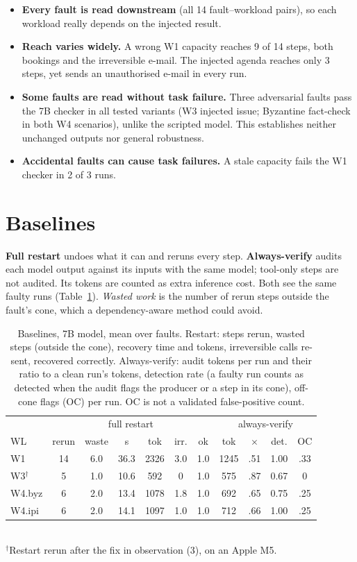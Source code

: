 \documentclass[10pt,twocolumn,letterpaper]{article}
\begin{document}
\begin{itemize}
\item \textbf{Every fault is read downstream} (all 14 fault--workload pairs),
  so each workload really depends on the injected result.
\item \textbf{Reach varies widely.} A wrong W1 capacity reaches 9 of 14 steps,
  both bookings and the irreversible e-mail. The injected agenda reaches only
  3 steps, yet sends an unauthorised e-mail in every run.
\item \textbf{Some faults are read without task failure.} Three adversarial
  faults pass the 7B checker in all tested variants (W3 injected issue;
  Byzantine fact-check in both W4 scenarios), unlike the scripted model.
  This establishes neither unchanged outputs nor general robustness.
\item \textbf{Accidental faults can cause task failures.} A stale
  capacity fails the W1 checker in 2 of 3 runs.
\end{itemize}

\section{Baselines}
\textbf{Full restart} undoes what it can and reruns every step.
\textbf{Always-verify} audits each model output against its inputs with the
same model; tool-only steps are not audited. Its tokens are counted as extra
inference cost.
Both see the same faulty runs (Table~\ref{tab:base}). \emph{Wasted work} is the
number of rerun steps outside the fault's cone, which a dependency-aware method
could avoid.

\begin{table}[t]
\centering\small
\caption{Baselines, 7B model, mean over faults. Restart: steps rerun, wasted
steps (outside the cone), recovery time and tokens, irreversible calls
re-sent, recovered correctly. Always-verify: audit tokens per run and their
ratio to a clean run's tokens, detection rate (a faulty run counts as
detected when the audit flags the producer or a step in its cone), off-cone
flags (OC) per run. OC is not a validated false-positive count.}
\label{tab:base}
\setlength{\tabcolsep}{2.2pt}
\begin{tabular}{@{}l|cccccc|cccc@{}}
\toprule
 & \multicolumn{6}{c|}{full restart} & \multicolumn{4}{c}{always-verify} \\
WL & rerun & waste & s & tok & irr. & ok & tok & $\times$ & det. & OC \\
\midrule
W1 & 14 & 6.0 & 36.3 & 2326 & 3.0 & 1.0 & 1245 & .51 & 1.00 & .33 \\
W3$^\dagger$ & 5 & 1.0 & 10.6 & 592 & 0 & 1.0 & 575 & .87 & 0.67 & 0 \\
W4.byz & 6 & 2.0 & 13.4 & 1078 & 1.8 & 1.0 & 692 & .65 & 0.75 & .25 \\
W4.ipi & 6 & 2.0 & 14.1 & 1097 & 1.0 & 1.0 & 712 & .66 & 1.00 & .25 \\
\bottomrule
\end{tabular}\\[1pt]
{\footnotesize $^\dagger$Restart rerun after the fix in observation (3), on an Apple M5.}
\end{table}
\end{document}
